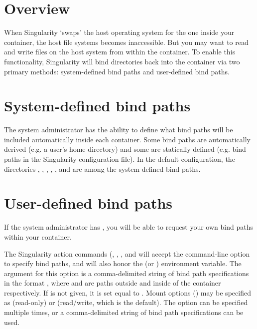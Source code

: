 \documentclass[letterpaper,10pt,english]{sphinxmanual}
\begin{document}
\section{Overview}
\label{\detokenize{bind_paths_and_mounts:overview}}
When Singularity ‘swaps’ the host operating system for the one inside your
container, the host file systems becomes inaccessible. But you may want to read
and write files on the host system from within the container. To enable this
functionality, Singularity will bind directories back into the container via two
primary methods: system-defined bind paths and user-defined bind paths.


\section{System-defined bind paths}
\label{\detokenize{bind_paths_and_mounts:system-defined-bind-paths}}
The system administrator has the ability to define what bind paths will be
included automatically inside each container. Some bind paths are automatically
derived (e.g. a user’s home directory) and some are statically defined (e.g.
bind paths in the Singularity configuration file). In the default
configuration, the directories  ,  ,  ,  ,
, and  are among the system-defined bind paths.


\section{User-defined bind paths}
\label{\detokenize{bind_paths_and_mounts:user-defined-bind-paths}}
If the system administrator has ,
you will be able to request your own bind paths within your container.

The Singularity action commands (, , , and
 will accept the  command-line option to specify
bind paths, and will also honor the  (or
) environment variable. The argument for this option is
a comma-delimited string of bind path specifications in the format
, where  and  are paths outside and inside
of the container respectively. If  is not given, it is set equal to
. Mount options () may be specified as  (read-only) or
 (read/write, which is the default). The  option can be
specified multiple times, or a comma-delimited string of bind path
specifications can be used.
\end{document}
